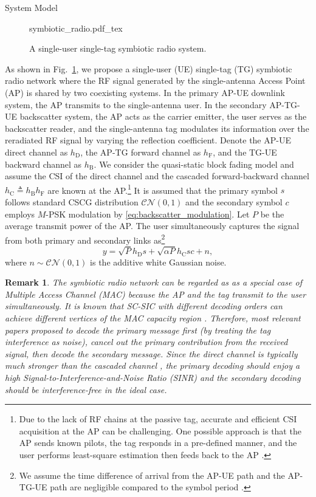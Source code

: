 \documentclass[journal]{IEEEtran}
\newtheorem{remark}{Remark}
\begin{document}
	\begin{section}{System Model}
		\begin{figure}[!t]
			\centering
			\def\svgwidth{0.9\columnwidth}
			{symbiotic_radio.pdf_tex}
			\caption{A single-user single-tag symbiotic radio system.}
			\label{fi:symbiotic_radio}
		\end{figure}
		As shown in Fig.~\ref{fi:symbiotic_radio}, we propose a single-user (UE) single-tag (TG) symbiotic radio network where the RF signal generated by the single-antenna Access Point (AP) is shared by two coexisting systems. In the primary AP-UE downlink system, the AP transmits to the single-antenna user. In the secondary AP-TG-UE backscatter system, the AP acts as the carrier emitter, the user serves as the backscatter reader, and the single-antenna tag modulates its information over the reradiated RF signal by varying the reflection coefficient. Denote the AP-UE direct channel as $h_{\mathrm{D}}$, the AP-TG forward channel as $h_{\mathrm{F}}$, and the TG-UE backward channel as $h_{\mathrm{B}}$. We consider the quasi-static block fading model and assume the CSI of the direct channel and the cascaded forward-backward channel $h_{\mathrm{C}} \triangleq h_{\mathrm{B}} h_{\mathrm{F}}$ are known at the AP.\footnote{Due to the lack of RF chains at the passive tag, accurate and efficient CSI acquisition at the AP can be challenging. One possible approach is that the AP sends known pilots, the tag responds in a pre-defined manner, and the user performs least-square estimation then feeds back to the AP \cite{Bharadia2015,Yang2015b,Guo2019e}.} It is assumed that the primary symbol $s$ follows standard CSCG distribution $\mathcal{CN}(0,1)$ and the secondary symbol $c$ employs $M$-PSK modulation by \eqref{eq:backscatter_modulation}. Let $P$ be the average transmit power of the AP. The user simultaneously captures the signal from both primary and secondary links as\footnote{We assume the time difference of arrival from the AP-UE path and the AP-TG-UE path are negligible compared to the symbol period \cite{Guo2019b,Liang2020,Long2020a}.}
		\begin{equation}
			y = \sqrt{P} h_{\mathrm{D}} s + \sqrt{\alpha P} h_{\mathrm{C}} s c + n,
		\end{equation}
		where $n \sim \mathcal{CN}(0,1)$ is the additive white Gaussian noise.

		\begin{remark}
			The symbiotic radio network can be regarded as as a special case of Multiple Access Channel (MAC) because the AP and the tag transmit to the user simultaneously. It is known that SC-SIC with different decoding orders can achieve different vertices of the MAC capacity region \cite{Goldsmith2005}. Therefore, most relevant papers proposed to decode the primary message first (by treating the tag interference as noise), cancel out the primary contribution from the received signal, then decode the secondary message. Since the direct channel is typically much stronger than the cascaded channel \cite{Ozdogan2020}, the primary decoding should enjoy a high Signal-to-Interference-and-Noise Ratio (SINR) and the secondary decoding should be interference-free in the ideal case.
		\end{remark}


\end{section}
\end{document}
